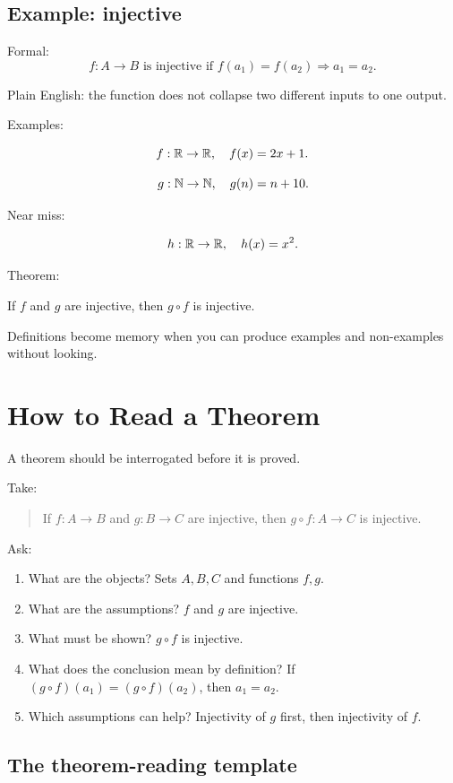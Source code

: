 \documentclass[11pt]{article}
\begin{document}
\subsection{Example: injective}

Formal:
\[
f:A\to B \text{ is injective if } f(a_1)=f(a_2)\Rightarrow a_1=a_2.
\]

Plain English: the function does not collapse two different inputs to one output.

Examples:

\[
f:\mathbb{R}\to\mathbb{R},\quad f(x)=2x+1.
\]

\[
g:\mathbb{N}\to\mathbb{N},\quad g(n)=n+10.
\]

Near miss:

\[
h:\mathbb{R}\to\mathbb{R},\quad h(x)=x^2.
\]

Theorem:

If $f$ and $g$ are injective, then $g\circ f$ is injective.

\begin{focusbox}
Definitions become memory when you can produce examples and non-examples without looking.
\end{focusbox}

\newpage
\section{How to Read a Theorem}

A theorem should be interrogated before it is proved.

Take:

\begin{quote}
If $f:A\to B$ and $g:B\to C$ are injective, then $g\circ f:A\to C$ is injective.
\end{quote}

Ask:

\begin{enumerate}
\item What are the objects? Sets $A,B,C$ and functions $f,g$.
\item What are the assumptions? $f$ and $g$ are injective.
\item What must be shown? $g\circ f$ is injective.
\item What does the conclusion mean by definition? If $(g\circ f)(a_1)=(g\circ f)(a_2)$, then $a_1=a_2$.
\item Which assumptions can help? Injectivity of $g$ first, then injectivity of $f$.
\end{enumerate}

\subsection{The theorem-reading template}
\end{document}
